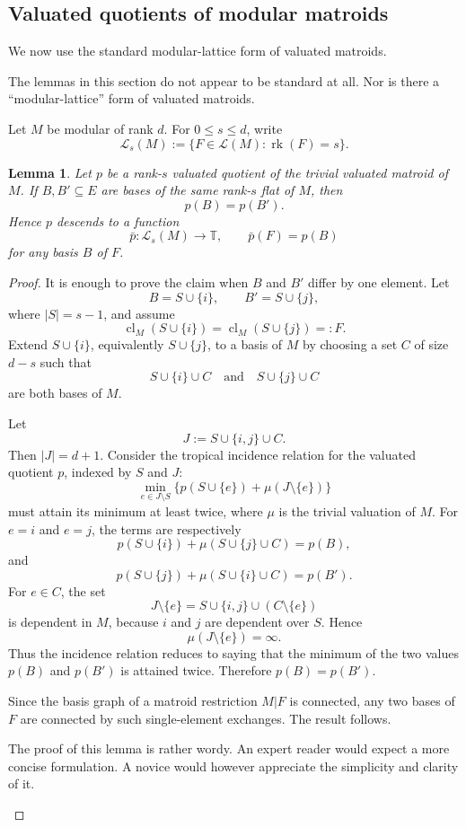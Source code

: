 \documentclass[12pt]{article}
\newcommand{\rk}{\operatorname{rk}}
\newcommand{\cl}{\operatorname{cl}}
\newcommand{\cL}{\mathcal L}
\theoremstyle{plain}
\newtheorem{lemma}[theorem]{Lemma}
\theoremstyle{definition}
\newcommand{\review}[1]{\begin{reviewbox}#1\end{reviewbox}}
\begin{document}
\subsection{Valuated quotients of modular matroids}

We now use the standard modular-lattice form of valuated matroids.
\review{
The lemmas in this section do not appear to be standard at all. Nor is there a ``modular-lattice'' form of valuated matroids.
}

Let \(M\) be modular of rank \(d\).  For \(0\le s\le d\), write
\[
   \cL_s(M):=\{F\in \cL(M):\rk(F)=s\}.
\]

\begin{lemma}\label{lem:flat-invariance}
Let \(p\) be a rank-\(s\) valuated quotient of the trivial valuated matroid of \(M\).  If \(B,B'\subseteq E\) are bases of the same rank-\(s\) flat of \(M\), then
\[
   p(B)=p(B').
\]
Hence \(p\) descends to a function
\[
   \bar p:\cL_s(M)\longrightarrow \mathbb T,\qquad
   \bar p(F)=p(B)
\]
for any basis \(B\) of \(F\).
\end{lemma}

\begin{proof}
It is enough to prove the claim when \(B\) and \(B'\) differ by one element.  Let
\[
   B=S\cup\{i\},\qquad B'=S\cup\{j\},
\]
where \(|S|=s-1\), and assume
\[
   \cl_M(S\cup\{i\})=\cl_M(S\cup\{j\})=:F.
\]
Extend \(S\cup\{i\}\), equivalently \(S\cup\{j\}\), to a basis of \(M\) by choosing a set \(C\) of size \(d-s\) such that
\[
   S\cup\{i\}\cup C
   \quad\text{and}\quad
   S\cup\{j\}\cup C
\]
are both bases of \(M\).

Let
\[
   J:=S\cup\{i,j\}\cup C.
\]
Then \(|J|=d+1\).  Consider the tropical incidence relation for the valuated quotient \(p\), indexed by \(S\) and \(J\):
\[
   \min_{e\in J\setminus S}\{p(S\cup\{e\})+\mu(J\setminus\{e\})\}
\]
must attain its minimum at least twice, where \(\mu\) is the trivial valuation of \(M\).  For \(e=i\) and \(e=j\), the terms are respectively
\[
   p(S\cup\{i\})+\mu(S\cup\{j\}\cup C)=p(B),
\]
and
\[
   p(S\cup\{j\})+\mu(S\cup\{i\}\cup C)=p(B').
\]
For \(e\in C\), the set
\[
   J\setminus\{e\}=S\cup\{i,j\}\cup(C\setminus\{e\})
\]
is dependent in \(M\), because \(i\) and \(j\) are dependent over \(S\).  Hence
\[
   \mu(J\setminus\{e\})=\infty.
\]
Thus the incidence relation reduces to saying that the minimum of the two values \(p(B)\) and \(p(B')\) is attained twice.  Therefore \(p(B)=p(B')\).

Since the basis graph of a matroid restriction \(M|F\) is connected, any two bases of \(F\) are connected by such single-element exchanges.  The result follows.
\review{The proof of this lemma is rather wordy. An expert reader would expect a more concise formulation. A novice would however appreciate the simplicity and clarity of it.}
\end{proof}
\end{document}
